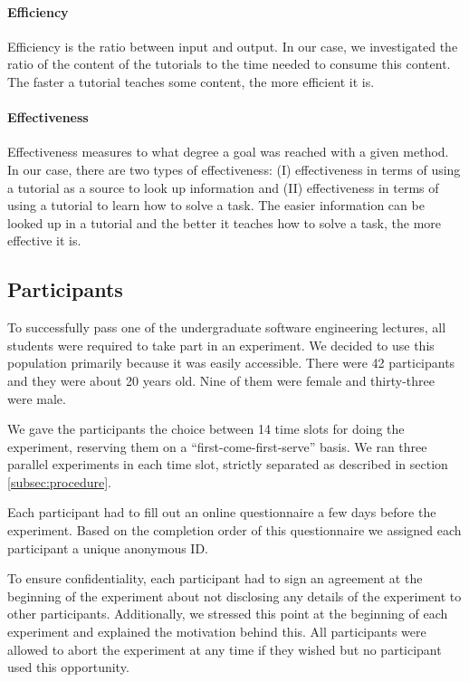\paragraph{Efficiency} Efficiency is the ratio between input and output. In our case, we investigated the ratio of the content of the tutorials to the time needed to consume this content. The faster a tutorial teaches some content, the more efficient it is.


\paragraph{Effectiveness} Effectiveness measures to what degree a goal was reached with a given method. In our case, there are two types of effectiveness: (I) effectiveness in terms of using a tutorial as a source to look up information and (II)  effectiveness in terms of using a tutorial to learn how to solve a task. The easier information can be looked up in a tutorial and the better it teaches how to solve a task, the more effective it is.



\subsection{Participants}
To successfully pass one of the undergraduate software engineering lectures, all students were required to take part in an experiment. We decided to use this population primarily because it was easily accessible. There were 42 participants and they were about 20 years old. Nine of them were female and thirty-three were male. 



We gave the participants the choice between 14 time slots for doing the experiment, reserving them on a \enquote{first-come-first-serve} basis. We ran three parallel experiments in each time slot, strictly separated as described in section \ref{subsec:procedure}.

Each participant had to fill out an online questionnaire a few days before the experiment. Based on the completion order of this questionnaire we assigned each participant a unique anonymous ID.

To ensure confidentiality, each participant had to sign an agreement at the beginning of the experiment about not disclosing any details of the experiment to other participants. Additionally, we stressed this point at the beginning of each experiment and explained the motivation behind this. All participants were allowed to abort the experiment at any time if they wished but no participant used this opportunity. 


